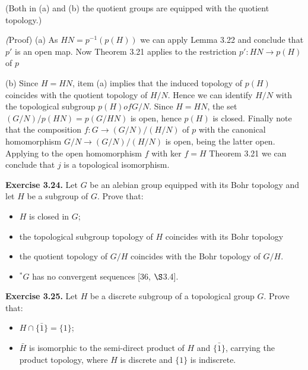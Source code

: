 \documentclass[12pt]{article}
\begin{document}
    (Both in (a) and (b) the quotient groups are equipped with the quotient topology.)


    \emph(Proof) (a) As $HN = p^{-1}(p(H))$ we can apply Lemma 3.22 and conclude that $p'$ is an open map. Now Theorem
    3.21 applies to the restriction $p' : HN \to p(H)$ of $p$


    (b) Since $H = HN$, item (a) implies that the induced topology of $p(H)$ coincides with the quotient topology
    of $H/N$. Hence we can identify $H/N$ with the topological subgroup $p(H) of G/N$. Since $H = HN$, the set
    $(G/N) / p(HN) = p(G / HN)$ is open, hence $p(H)$ is closed. Finally note that the composition $f : G \to (G/N)/(H/N)$
    of $p$ with the canonical homomorphism $G/N \to (G/N)/(H/N)$ is open, being the latter open.
    Applying to the open homomorphism $f$ with ker $f = H$ Theorem 3.21 we can conclude that $j$ is a topological
    isomorphism.
    

\textbf{Exercise 3.24.} Let $G$ be an alebian group equipped with its Bohr topology and let $H$ be a subgroup of $G$. Prove
that:


    \begin{itemize}

        \item $H$ is closed in $G$;
       
        \item the topological subgroup topology of $H$ coincides with its Bohr topology

        \item the quotient topology of $G/H$ coincides with the Bohr topology of $G/H$.
       
        \item $^* G$ has no convergent sequences [36, $\S$3.4].
    
    \end{itemize}


\textbf{Exercise 3.25.} Let $H$ be a discrete subgroup of a topological group $G$. Prove that:


    \begin{itemize}

        \item $H \cap \bar{\{1\}} = \{1\}$;
    
        \item $\bar{H}$ is isomorphic to the semi-direct product of $H$ and $\bar{\{1\}}$, carrying the product topology, where $H$ is discrete
        and $\{1\}$ is indiscrete.
    
    \end{itemize}
\end{document}
